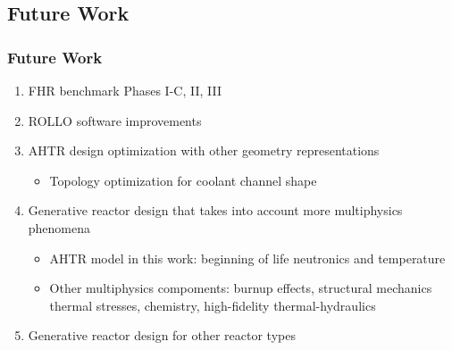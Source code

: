 \subsection{Future Work}
\begin{frame}
    \frametitle{Future Work}
    \begin{enumerate}
        \item FHR benchmark Phases I-C, II, III
        \item ROLLO software improvements 
        \item AHTR design optimization with other geometry representations 
            \begin{itemize}
                \item Topology optimization for coolant channel shape 
            \end{itemize}
        \item Generative reactor design that takes into account more multiphysics phenomena 
            \begin{itemize}
                \item AHTR model in this work: beginning of life neutronics and temperature 
                \item Other multiphysics compoments: burnup effects, structural mechanics 
                thermal stresses, chemistry, high-fidelity thermal-hydraulics 
            \end{itemize}
        \item Generative reactor design for other reactor types
    \end{enumerate}
\end{frame}